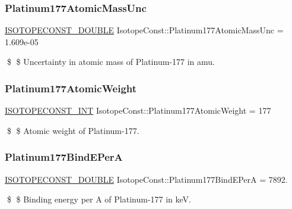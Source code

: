 \subsubsection{\texorpdfstring{Platinum177\+Atomic\+Mass\+Unc}{Platinum177AtomicMassUnc}}
{\footnotesize\ttfamily \mbox{\hyperlink{group___isotope_const-_macros_ga8f45a7272ce02c0b4c65c44636ed719a}{I\+S\+O\+T\+O\+P\+E\+C\+O\+N\+S\+T\+\_\+\+D\+O\+U\+B\+LE}} Isotope\+Const\+::\+Platinum177\+Atomic\+Mass\+Unc = 1.\+609e-\/05}

\$ \$ Uncertainty in atomic mass of Platinum-\/177 in amu. \mbox{\label{group___isotope_const-_platinum-_pt177_gaabae0734cbf7451a107ced14bc70a4b2}} 
\subsubsection{\texorpdfstring{Platinum177\+Atomic\+Weight}{Platinum177AtomicWeight}}
{\footnotesize\ttfamily \mbox{\hyperlink{group___isotope_const-_macros_ga5f18360b3e99483a35c32d789e62621c}{I\+S\+O\+T\+O\+P\+E\+C\+O\+N\+S\+T\+\_\+\+I\+NT}} Isotope\+Const\+::\+Platinum177\+Atomic\+Weight = 177}

\$ \$ Atomic weight of Platinum-\/177. \mbox{\label{group___isotope_const-_platinum-_pt177_gaa99dc532bad05d286f688795d70cb295}} 
\subsubsection{\texorpdfstring{Platinum177\+Bind\+E\+PerA}{Platinum177BindEPerA}}
{\footnotesize\ttfamily \mbox{\hyperlink{group___isotope_const-_macros_ga8f45a7272ce02c0b4c65c44636ed719a}{I\+S\+O\+T\+O\+P\+E\+C\+O\+N\+S\+T\+\_\+\+D\+O\+U\+B\+LE}} Isotope\+Const\+::\+Platinum177\+Bind\+E\+PerA = 7892.}

\$ \$ Binding energy per A of Platinum-\/177 in keV. \mbox{\label{group___isotope_const-_platinum-_pt177_ga3b35f647f13ee8f0c359350e2fd8d80b}} 
